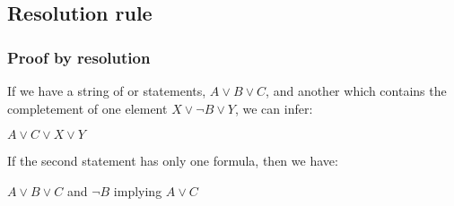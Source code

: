 \subsection{Resolution rule}

\subsubsection{Proof by resolution}

If we have a string of or statements, \(A\lor B\lor C\), and another which contains the completement of one element \(X\lor \neg B\lor Y\), we can infer:

\(A\lor C\lor X\lor Y\)

If the second statement has only one formula, then we have:

\(A\lor B\lor C\) and \(\neg B\) implying \(A\lor C\)


